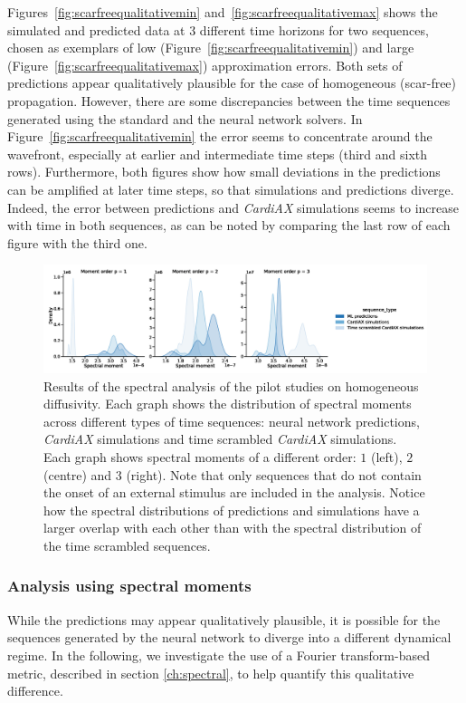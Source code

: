 \documentclass[utf8]{frontiers_suppmat} %
\begin{document}
Figures~\ref{fig:scarfreequalitativemin} and~\ref{fig:scarfreequalitativemax} shows the simulated and predicted data at 3 different time horizons for two sequences, chosen as exemplars of low (Figure~\ref{fig:scarfreequalitativemin}) and large (Figure~\ref{fig:scarfreequalitativemax}) approximation errors. Both sets of predictions appear qualitatively plausible for the case of homogeneous (scar-free) propagation. However, there are some discrepancies between the time sequences generated using the standard and the neural network solvers.
In Figure~\ref{fig:scarfreequalitativemin} the error seems to concentrate around the wavefront, especially at earlier and intermediate time steps (third and sixth rows). Furthermore, both figures show how small deviations in the predictions can be amplified at later time steps, so that simulations and predictions diverge. Indeed, the error between predictions and \textit{CardiAX} simulations seems to increase with time in both sequences, as can be noted by comparing the last row of each figure with the third one.


\begin{figure}[!htp]
\centering
\includegraphics[width=\textwidth]{figures/old_figures/Figure-5.jpg}
\caption{
    Results of the spectral analysis of the pilot studies on homogeneous diffusivity. Each graph shows the distribution of spectral moments across different types of time sequences: neural network predictions, \textit{CardiAX} simulations and time scrambled \textit{CardiAX} simulations. Each graph shows spectral moments of a different order: $1$ (left), $2$ (centre) and $3$ (right). Note that only sequences that do not contain the onset of an external stimulus are included in the analysis. Notice how the spectral distributions of predictions and simulations have a larger overlap with each other than with the spectral distribution of the time scrambled sequences.
}\label{fig:momentssimhist}
\end{figure}

\subsubsection{Analysis using spectral moments}\label{ch:fft}
While the predictions may appear qualitatively plausible, it is possible for the sequences generated by the neural network to diverge into a different dynamical regime. In the following, we investigate the use of a Fourier transform-based metric, described in section \ref{ch:spectral}, to help quantify this qualitative difference.
\end{document}
